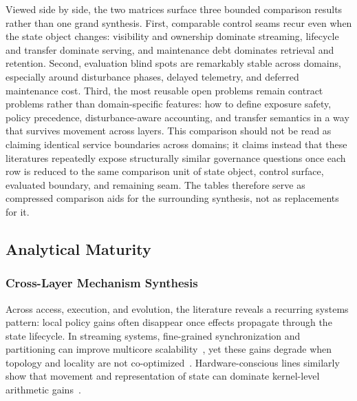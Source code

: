 \documentclass[acmsmall,screen,review]{acmart}
\begin{document}
Viewed side by side, the two matrices surface three bounded comparison results rather than one grand synthesis. First, comparable control seams recur even when the state object changes: visibility and ownership dominate streaming, lifecycle and transfer dominate serving, and maintenance debt dominates retrieval and retention. Second, evaluation blind spots are remarkably stable across domains, especially around disturbance phases, delayed telemetry, and deferred maintenance cost. Third, the most reusable open problems remain contract problems rather than domain-specific features: how to define exposure safety, policy precedence, disturbance-aware accounting, and transfer semantics in a way that survives movement across layers. This comparison should not be read as claiming identical service boundaries across domains; it claims instead that these literatures repeatedly expose structurally similar governance questions once each row is reduced to the same comparison unit of state object, control surface, evaluated boundary, and remaining seam. The tables therefore serve as compressed comparison aids for the surrounding synthesis, not as replacements for it.

\subsection{Analytical Maturity}

\subsubsection{Cross-Layer Mechanism Synthesis}

Across access, execution, and evolution, the literature reveals a recurring systems pattern: local policy gains often disappear once effects propagate through the state lifecycle. In streaming systems, fine-grained synchronization and partitioning can improve multicore scalability~\cite{zhang2017revisiting,zhang2020concurrent}, yet these gains degrade when topology and locality are not co-optimized~\cite{zhang2019briskstream}. Hardware-conscious lines similarly show that movement and representation of state can dominate kernel-level arithmetic gains~\cite{zhang2020finestream,zeng2024cstream}.
\end{document}
